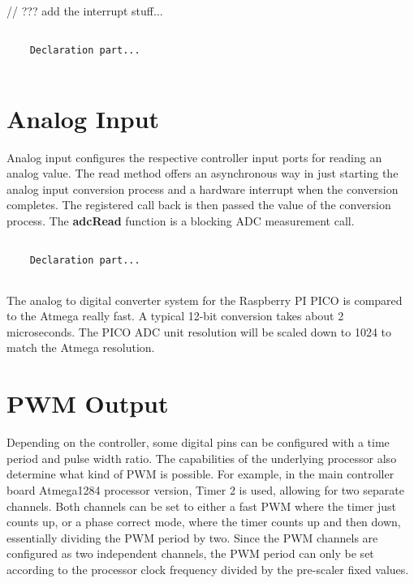 // ??? add the interrupt stuff...

\lstset{language=c++, style=codesnippetstyle}
\begin{lstlisting}
   
    Declaration part...
    
\end{lstlisting}

\section{Analog Input}

Analog input configures the respective controller input ports for reading an analog value. The read method offers an asynchronous way in just starting the analog input conversion process and a hardware interrupt when the conversion completes. The registered call back is then passed the value of the conversion process. The \textbf{adcRead} function is a blocking ADC measurement call.

\lstset{language=c++, style=codesnippetstyle}
\begin{lstlisting}
   
    Declaration part...
    
\end{lstlisting}

The analog to digital converter system for the Raspberry PI PICO is compared to the Atmega really fast. A typical 12-bit conversion takes about 2 microseconds. The PICO ADC unit resolution will be scaled down to 1024 to match the Atmega resolution.

\section{PWM Output}

Depending on the controller, some digital pins can be configured with a time period and pulse width ratio. The capabilities of the underlying processor also determine what kind of PWM is possible. For example, in the main controller board Atmega1284 processor version, Timer 2 is used, allowing for two separate channels. Both channels can be set to either a fast PWM where the timer just counts up, or a phase correct mode, where the timer counts up and then down, essentially dividing the PWM period by two. Since the PWM channels are configured as two independent channels, the PWM period can only be set according to the processor clock frequency divided by the pre-scaler fixed values.

